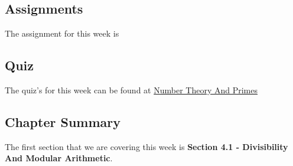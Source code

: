 \subsection{Assignments}

The assignment for this week is   

\subsection{Quiz}

The quiz's for this week can be found at \href{https://applied.cs.colorado.edu/mod/quiz/view.php?id=51708}{Number Theory And Primes}  

\subsection{Chapter Summary}

The first section that we are covering this week is \textbf{Section 4.1 - Divisibility And Modular Arithmetic}. 

